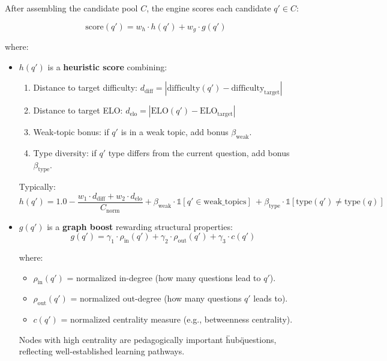 \documentclass[sigconf,authordraft,twoside]{acmart}
\begin{document}
After assembling the candidate pool $C$, the engine scores each candidate $q' \in C$:

\begin{equation}
\text{score}(q') = w_h \cdot h(q') + w_g \cdot g(q')
\end{equation}

where:

\begin{itemize}
\item $h(q')$ is a \textbf{heuristic score} combining:
   \begin{enumerate}
   \item Distance to target difficulty: $d_{\text{diff}} = |\text{difficulty}(q') - \text{difficulty}_{\text{target}}|$
   \item Distance to target ELO: $d_{\text{elo}} = |\text{ELO}(q') - \text{ELO}_{\text{target}}|$
   \item Weak-topic bonus: if $q'$ is in a weak topic, add bonus $\beta_{\text{weak}}$.
   \item Type diversity: if $q'$ type differs from the current question, add bonus $\beta_{\text{type}}$.
   \end{enumerate}
   
   Typically:
   \begin{equation}
   h(q') = 1.0 - \frac{w_1 \cdot d_{\text{diff}} + w_2 \cdot d_{\text{elo}}}{C_{\text{norm}}} + \beta_{\text{weak}} \cdot \mathbb{1}[q' \in \text{weak\_topics}] 
   \ 



   
   + \beta_{\text{type}} \cdot \mathbb{1}[\text{type}(q') \neq \text{type}(q)]
   \end{equation}

\item $g(q')$ is a \textbf{graph boost} rewarding structural properties:
   \begin{equation}
   g(q') = \gamma_1 \cdot \rho_{\text{in}}(q') + \gamma_2 \cdot \rho_{\text{out}}(q') + \gamma_3 \cdot c(q')
   \end{equation}
   
   where:
   \begin{itemize}
   \item $\rho_{\text{in}}(q')$ = normalized in-degree (how many questions lead to $q'$).
   \item $\rho_{\text{out}}(q')$ = normalized out-degree (how many questions $q'$ leads to).
   \item $c(q')$ = normalized centrality measure (e.g., betweenness centrality).
   \end{itemize}
   
   Nodes with high centrality are pedagogically important \"hub\" questions, reflecting well-established learning pathways.
\end{itemize}
\end{document}
